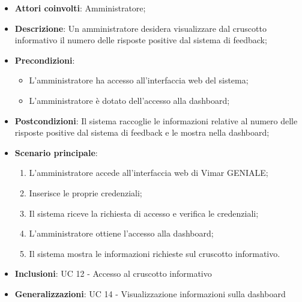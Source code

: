 \begin{itemize}
    \item \textbf{Attori coinvolti}: Amministratore;
    \item \textbf{Descrizione}: Un amministratore desidera visualizzare dal cruscotto informativo il numero delle risposte positive dal sistema di feedback;
    \item \textbf{Precondizioni}: 
        \begin{itemize}
            \item L’amministratore ha accesso all’interfaccia web del sistema;
            \item L’amministratore è dotato dell’accesso alla dashboard;
        \end{itemize}
    \item \textbf{Postcondizioni}: Il sistema raccoglie le informazioni relative al numero delle risposte positive dal sistema di feedback e le mostra nella dashboard;
    \item \textbf{Scenario principale}:
    \begin{enumerate}
    \item L’amministratore accede all’interfaccia web di Vimar GENIALE;
    \item Inserisce le proprie credenziali;
    \item Il sistema riceve la richiesta di accesso e verifica le credenziali;
    \item L’amministratore ottiene l’accesso alla dashboard;
    \item Il sistema mostra le informazioni richieste sul cruscotto informativo.
    \end{enumerate}
    \item \textbf{Inclusioni}: UC 12 - Accesso al cruscotto informativo
    \item \textbf{Generalizzazioni}: UC 14 - Visualizzazione informazioni sulla dashboard
\end{itemize}

